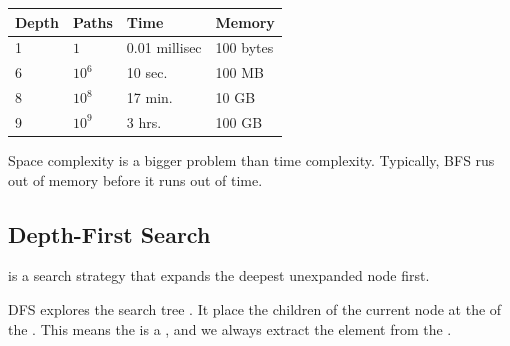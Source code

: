 \begin{table}[ht!]
    \renewcommand{\arraystretch}{1.25}
    \centering
    \begin{tabular}{| l | l | l | l |}
        \hline
        Depth & Paths    & Time          & Memory    \\ \hline
        1     & $1$      & 0.01 millisec & 100 bytes \\ \hline
        6     & $10^6$   & 10 sec.       & 100 MB    \\ \hline
        8     & $10^8$   & 17 min.       & 10 GB     \\ \hline
        9     & $10^{9}$ & 3 hrs.        & 100 GB    \\ \hline
    \end{tabular}
\end{table}

Space complexity is a bigger problem than time complexity. Typically, BFS rus out of memory before it runs out of time.

\subsection{Depth-First Search}

\begin{definition}\label{def:dfs}
     is a search strategy that expands the deepest unexpanded node first.
\end{definition}

DFS explores the search tree . It place the children of the current node at the  of the \Frontier. This means the \Frontier is a , and we always extract the  element from the \Frontier.